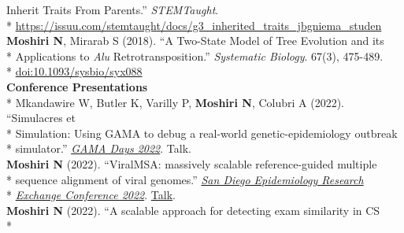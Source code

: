 \documentclass[margin,line]{res}
\begin{document}
\begin{resume}
\hspace*{9mm} Inherit Traits From Parents.'' \textit{STEMTaught}.\\*\vspace{2mm}
\hspace*{8mm} \href{https://issuu.com/stemtaught/docs/g3_inherited_traits_jbgniema_studen}{https://issuu.com/stemtaught/docs/g3\_inherited\_traits\_jbgniema\_studen}\\
\hspace*{4mm} \textbf{Moshiri N}, Mirarab S (2018). ``A Two-State Model of Tree Evolution and its\\*
\hspace*{9mm} Applications to \textit{Alu} Retrotransposition.'' \textit{Systematic Biology}. 67(3), 475-489.\\*\vspace{2mm}
\hspace*{8mm} \href{https://doi.org/10.1093/sysbio/syx088}{doi:10.1093/sysbio/syx088}
~\\
\textbf{Conference Presentations}\vspace{2mm}\\*
\hspace*{4mm} Mkandawire W, Butler K, Varilly P, \textbf{Moshiri N}, Colubri A (2022). ``Simulacres et\\*
\hspace*{9mm} Simulation: Using GAMA to debug a real-world genetic-epidemiology outbreak\\*\vspace{2mm}
\hspace*{8mm} simulator.'' \href{https://gama-platform.org/Gama-Days-2022/}{\textit{GAMA Days 2022}}. Talk.\\
\hspace*{4mm} \textbf{Moshiri N} (2022). ``ViralMSA: massively scalable reference-guided multiple\\*
\hspace*{9mm} sequence alignment of viral genomes.'' \href{https://publichealth.sdsu.edu/epiexchange}{\textit{San Diego Epidemiology Research}}\\*\vspace{2mm}
\hspace*{8mm} \href{https://publichealth.sdsu.edu/epiexchange}{\textit{Exchange Conference 2022}}. \href{https://docs.google.com/document/d/e/2PACX-1vTufgGn-94tzBuzs1MXideQPxZApXW0EvSHIyfKQX8xdXPvwVo1H3C4WbWSgmp67BbERnjzc_tkYqdm/pub}{Talk}.\\
\hspace*{4mm} \textbf{Moshiri N} (2022). ``A scalable approach for detecting exam similarity in CS\\*

\end{resume}
\end{document}
